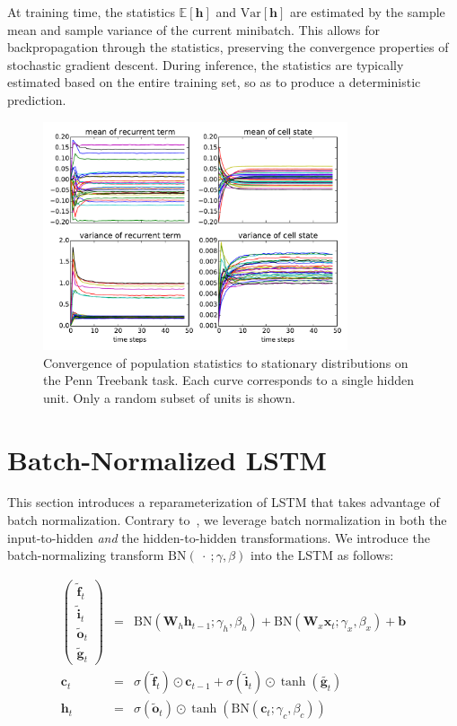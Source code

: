 \documentclass{article} %
\newcommand{\vect}[1]{\mathbf{#1}}
\newcommand{\mat}[1]{\mathbf{#1}}
\newcommand{\ewprod}{\odot}
\begin{document}
At training time, the statistics $\mathbb{E}[\vect{h}]$ and $\mathrm{Var}[\vect{h}]$ are estimated
by the sample mean and sample variance of the current minibatch.
This allows for backpropagation through the statistics, preserving the convergence properties of stochastic gradient descent.
During inference, the statistics are typically estimated based on the entire training set, so as to produce a deterministic prediction.

\begin{figure}[!ht]
\center
\includegraphics[width=0.8\textwidth]{figures/popstat_stationarity.pdf}
\caption{Convergence of population statistics to stationary distributions on the 
Penn Treebank task. Each curve corresponds to a single hidden unit. Only a random subset of units is shown.}
\label{fig:popstat_stationarity}
\end{figure}



\section{Batch-Normalized LSTM}
\label{sec:recurrent-batch-normalization}

This section introduces a reparameterization of LSTM that takes advantage of 
batch normalization. Contrary to~\citet{cesar, baidu}, we 
leverage batch normalization in both the input-to-hidden \emph{and} the hidden-to-hidden transformations.
We introduce the batch-normalizing transform $\mathrm{BN}(\ \cdot\ ; \gamma, \beta)$ 
into the LSTM as follows:

\begin{eqnarray}
\left(\begin{array}{ccc}
\tilde{\vect{f}}_t \\
\tilde{\vect{i}}_t \\
\tilde{\vect{o}}_t \\
\tilde{\vect{g}}_t
\end{array}\right)
 &=&
 \mathrm{BN} (\mat{W}_h \vect{h}_{t-1}; \gamma_h, \beta_h) +
 \mathrm{BN} (\mat{W}_x \vect{x}_t   ; \gamma_x, \beta_x) +
 \vect{b}
\\
\vect{c}_t &=& \sigma(\tilde{\vect{f}}_t) \ewprod \vect{c}_{t-1} +
               \sigma(\tilde{\vect{i}}_t) \ewprod \tanh(\tilde{\vect{g}_t}) \\
\vect{h}_t &=& \sigma(\tilde{\vect{o}}_t) \ewprod \tanh(
 \mathrm{BN} (\vect{c}_t; \gamma_c, \beta_c)
)
\end{eqnarray}
\end{document}
